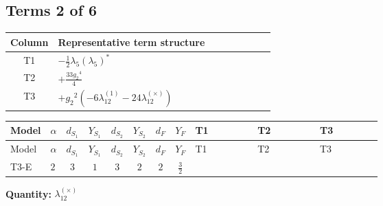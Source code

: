 \documentclass[8pt]{article}
\begin{document}
\begin{landscape}
\subsection*{Terms 2 of 6}
\begin{center}
\begin{tabular}{@{}c >{\raggedright\arraybackslash}p{0.82\linewidth}@{}}
\toprule
Column & Representative term structure \\
\midrule
T1 & \(\displaystyle -\frac{1}{2} {\lambda_5} \left({\lambda_5}\right)^{*}\) \\
\midrule
T2 & \(\displaystyle +\frac{33 {g_2}^4}{4}\) \\
\midrule
T3 & \(\displaystyle +{g_2}^2 (-6 {\lambda_{12}^{(1)}}-24 {\lambda_{12}^{(\times)}})\) \\
\midrule
\bottomrule
\end{tabular}
\end{center}
\smallskip
\tiny
\begin{longtable}{@{}llcccccc >{\raggedright\arraybackslash}p{0.21\linewidth} >{\raggedright\arraybackslash}p{0.21\linewidth} >{\raggedright\arraybackslash}p{0.21\linewidth}@{}}
\toprule
Model & $\alpha$ & $d_{S_1}$ & $Y_{S_1}$ & $d_{S_2}$ & $Y_{S_2}$ & $d_F$ & $Y_F$ & T1 & T2 & T3 \\
\midrule
\endfirsthead
\toprule
Model & $\alpha$ & $d_{S_1}$ & $Y_{S_1}$ & $d_{S_2}$ & $Y_{S_2}$ & $d_F$ & $Y_F$ & T1 & T2 & T3 \\
\midrule
\endhead
T3-E & $2$ & $3$ & $1$ & $3$ & $2$ & $2$ & $\frac{3}{2}$ & \scriptsize\adjustbox{max width=\linewidth}{$\begin{gathered} -\frac{1}{2} {\lambda_5} \left({\lambda_5}\right)^{*}\end{gathered}$} & \scriptsize\adjustbox{max width=\linewidth}{$\begin{gathered} +\frac{33 {g_2}^4}{4}\end{gathered}$} & \scriptsize\adjustbox{max width=\linewidth}{$\begin{gathered} +{g_2}^2 (-6 {\lambda_{12}^{(1)}}-24 {\lambda_{12}^{(\times)}})\end{gathered}$} \\
\midrule
\bottomrule
\end{longtable}
\clearpage
\noindent\textbf{Quantity: }$\lambda_{12}^{(\times)}$\par\smallskip

\end{landscape}
\end{document}
